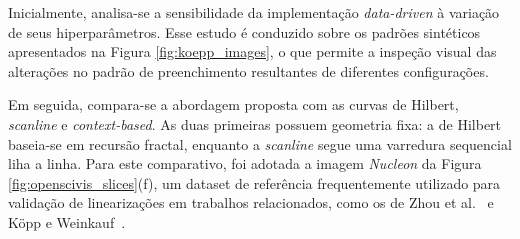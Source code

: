 \documentclass[12pt]{article}
\begin{document}
Inicialmente, analisa-se a sensibilidade da implementação \textit{data-driven} à variação de seus hiperparâmetros.
Esse estudo é conduzido sobre os padrões sintéticos apresentados na Figura \ref{fig:koepp_images},
o que permite a inspeção visual das alterações no padrão de preenchimento resultantes de diferentes configurações.

Em seguida, compara-se a abordagem proposta com as curvas de Hilbert, \textit{scanline} e \textit{context-based}.
As duas primeiras possuem geometria fixa: a de Hilbert baseia-se em recursão fractal, enquanto a \textit{scanline}
segue uma varredura sequencial liha a linha. 
Para este comparativo, foi adotada a
imagem \textit{Nucleon} da Figura \ref{fig:openscivis_slices}(f), um dataset de referência frequentemente utilizado
para validação de linearizações em trabalhos relacionados, como os de Zhou et al.~\cite{zhou:20} e Köpp e
Weinkauf~\cite{KoeppWeinkauf2022_TMTM}.






\end{document}
